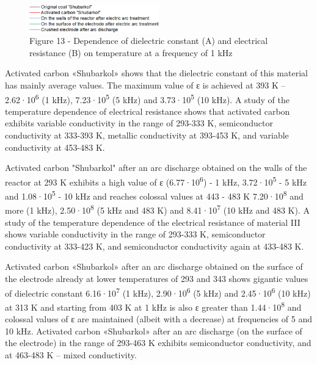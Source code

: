 \begin{figure}[H]
	\centering
	\includegraphics[width=0.5\textwidth]{assets/66}
	\caption*{Figure 13 - Dependence of dielectric constant (A) and electrical resistance (B) on temperature at a frequency of 1 kHz}
\end{figure}

\begin{multicols}{2}
Activated carbon «Shubarkol» shows that the dielectric constant of this
material has mainly average values. The maximum value of ε is achieved
at 393 K -- 2.62·10\textsuperscript{6} (1 kHz),
7.23·10\textsuperscript{5} (5 kHz) and 3.73·10\textsuperscript{5} (10
kHz). A study of the temperature dependence of electrical resistance
shows that activated carbon exhibits variable conductivity in the range
of 293-333 K, semiconductor conductivity at 333-393 K, metallic
conductivity at 393-453 K, and variable conductivity at 453-483 K.

Activated carbon "Shubarkol" after an arc discharge obtained on the
walls of the reactor at 293 K exhibits a high value of ε
(6.77·10\textsuperscript{6}) - 1 kHz, 3.72·10\textsuperscript{5} - 5 kHz
and 1.08·10\textsuperscript{5} - 10 kHz and reaches colossal values
\hspace{0pt}\hspace{0pt}at 443 - 483 K 7.20·10\textsuperscript{8} and
more (1 kHz), 2.50·10\textsuperscript{8} (5 kHz and 483 K) and
8.41·10\textsuperscript{7} (10 kHz and 483 K). A study of the
temperature dependence of the electrical resistance of material III
shows variable conductivity in the range of 293-333 K, semiconductor
conductivity at 333-423 K, and semiconductor conductivity again at
433-483 K.

Activated carbon «Shubarkol» after an arc discharge obtained on the
surface of the electrode already at lower temperatures of 293 and 343
shows gigantic values \hspace{0pt}\hspace{0pt}of dielectric constant
6.16·10\textsuperscript{7} (1 kHz), 2.90·10\textsuperscript{6} (5 kHz)
and 2.45·10\textsuperscript{6} (10 kHz) at 313 K and starting from 403 K
at 1 kHz is also ε greater than 1.44·10\textsuperscript{8} and colossal
values \hspace{0pt}\hspace{0pt}of ε are maintained (albeit with a
decrease) at frequencies of 5 and 10 kHz. Activated carbon «Shubarkol»
after an arc discharge (on the surface of the electrode) in the range of
293-463 K exhibits semiconductor conductivity, and at 463-483 K -- mixed
conductivity.


\end{multicols}
